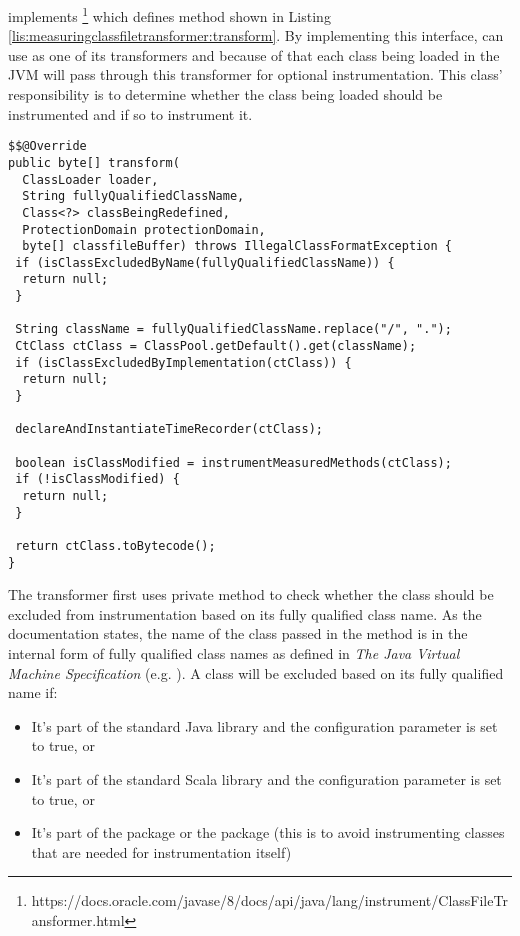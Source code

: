 \noindent {} implements  \footnote{https://docs.oracle.com/javase/8/docs/api/java/lang/instrument/ClassFileTransformer.html} which defines method  shown in Listing \ref{lis:measuringclassfiletransformer:transform}. By implementing this interface,  can use  as one of its transformers and because of that each class being loaded in the JVM will pass through this transformer for optional instrumentation. This class' responsibility is to determine whether the class being loaded should be instrumented and if so to instrument it.

\begin{lstlisting}[breaklines,caption={$MeasuringClassFileTransformer.transform$ implementation},label=lis:measuringclassfiletransformer:transform]
$$@Override
public byte[] transform(
  ClassLoader loader,
  String fullyQualifiedClassName,
  Class<?> classBeingRedefined,
  ProtectionDomain protectionDomain,
  byte[] classfileBuffer) throws IllegalClassFormatException {
 if (isClassExcludedByName(fullyQualifiedClassName)) {
  return null;
 }

 String className = fullyQualifiedClassName.replace("/", ".");
 CtClass ctClass = ClassPool.getDefault().get(className);
 if (isClassExcludedByImplementation(ctClass)) {
  return null;
 }

 declareAndInstantiateTimeRecorder(ctClass);

 boolean isClassModified = instrumentMeasuredMethods(ctClass);
 if (!isClassModified) {
  return null;
 }

 return ctClass.toBytecode();
}
\end{lstlisting}


\noindent The transformer first uses private method  to check whether the class should be excluded from instrumentation based on its fully qualified class name. As the documentation states, the name of the class passed in the method is in the internal form of fully qualified class names as defined in \textit{The Java Virtual Machine Specification} (e.g. ). A class will be excluded based on its fully qualified name if:
\begin{itemize}
  \item It's part of the standard Java library and the  configuration parameter is set to true, or
  \item It's part of the standard Scala library and the  configuration parameter is set to true, or
  \item It's part of the  package or the  package (this is to avoid instrumenting classes that are needed for instrumentation itself)
\end{itemize}

